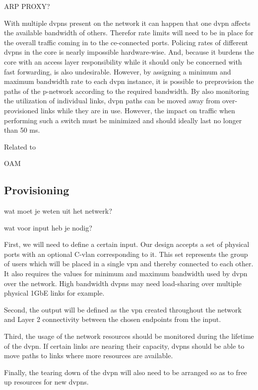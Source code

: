 ARP PROXY?

With multiple \acp{dvpn} present on the network it can happen that one \ac{dvpn} affects the available bandwidth of others. Therefor rate limits will need to be in place for the overall traffic coming in to the \ac{ce}-connected ports. Policing rates of different \acp{dvpn} in the core is nearly impossible hardware-wise. And, because it burdens the core with an access layer responsibility while it should only be concerned with fast forwarding, is also undesirable. However, by assigning a minimum and maximum bandwidth rate to each \ac{dvpn} instance, it is possible to preprovision the paths of the \ac{p}-network according to the required bandwidth. By also monitoring the utilization of individual links, \ac{dvpn} paths can be moved away from over-provisioned links while they are in use. However, the impact on traffic when performing such a switch must be minimized and should ideally last no longer than 50 ms.

Related to 

OAM



\subsection{Provisioning} %
\label{sub:provisioning}

wat moet je weten uit het netwerk?

wat voor input heb je nodig?

First, we will need to define a certain input. Our design accepts a set of physical ports with an optional C-\ac{vlan} corresponding to it. This set represents the group of users which will be placed in a single \ac{vpn} and thereby connected to each other. It also requires the values for minimum and maximum bandwidth used by \ac{dvpn} over the network. High bandwidth \acp{dvpn} may need load-sharing over multiple physical 1GbE links for example.

Second, the output will be defined as the \ac{vpn} created throughout the network and Layer 2 connectivity between the chosen endpoints from the input.

Third, the usage of the network resources should be monitored during the lifetime of the \ac{dvpn}. If certain links are nearing their capacity, \acp{dvpn} should be able to move paths to links where more resources are available.

Finally, the tearing down of the \ac{dvpn} will also need to be arranged so as to free up resources for new \acp{dvpn}.

